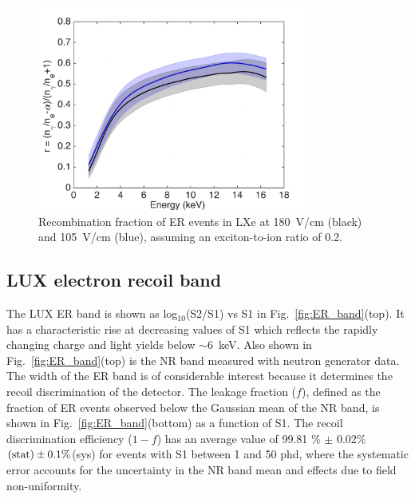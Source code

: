 \begin{figure}[h!]
\includegraphics[width=90mm]{fig/recombination.pdf}
\caption{Recombination fraction of ER events in LXe at 180~V/cm (black) and 105~V/cm (blue), assuming an exciton-to-ion ratio of 0.2.}
\label{fig:recombination}
\end{figure}

\subsection{LUX electron recoil band}

The LUX ER band is shown as log$_{10}$(S2/S1) vs S1 in Fig.~\ref{fig:ER_band}(top).  It has a characteristic rise at decreasing values of S1 which reflects the rapidly changing charge and light yields below $\sim$6~keV.  Also shown in Fig.~\ref{fig:ER_band}(top) is the NR band measured with neutron generator data\cite{DD-paper, lux-reanalysis}. The width of the ER band is of considerable interest because it determines the recoil discrimination of the detector. The leakage fraction ($f$), defined as the fraction of ER events observed below the Gaussian mean of the NR band, is shown in Fig.~\ref{fig:ER_band}(bottom) as a function of S1. The recoil discrimination efficiency ($1-f$) has an average value of 99.81 \% $\pm$ 0.02\%$\rm (stat) \pm 0.1\%$(sys) for events with S1 between 1 and 50 phd, where the systematic error accounts for the uncertainty in the NR band mean and effects due to field non-uniformity.

